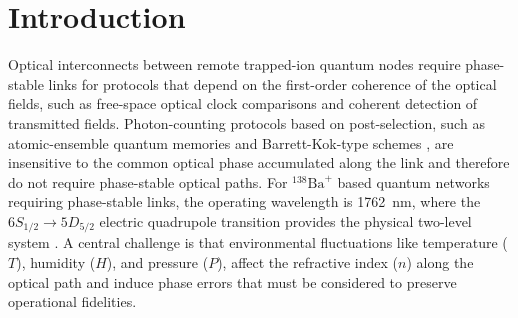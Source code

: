 \documentclass[aps,prapplied,reprint,groupedaddress,twocolumn,superscriptaddress,linenumbers]{revtex4-2}
\begin{document}
\maketitle

\section{Introduction}
\label{sec:intro}

Optical interconnects between remote trapped-ion quantum nodes require phase-stable links for protocols that depend on the first-order coherence of the optical fields, such as free-space optical clock comparisons \cite{giorgetta2013optical,shen2022free} and coherent detection of transmitted fields. Photon-counting protocols based on post-selection, such as atomic-ensemble quantum memories \cite{duan2001long} and Barrett-Kok-type schemes \cite{barrett2005efficient}, are insensitive to the common optical phase accumulated along the link and therefore do not require phase-stable optical paths. For $^{138}\mathrm{Ba}^+$ based quantum networks requiring phase-stable links, the operating wavelength is \SI{1762}{\nano\meter}, where the $6S_{1/2} \rightarrow 5D_{5/2}$ electric quadrupole transition provides the physical two-level system \cite{dietrich2009barium,arnold2020precision}. A central challenge is that environmental fluctuations like temperature ($T$), humidity ($H$), and pressure ($P$), affect the refractive index ($n$) along the optical path and induce phase errors that must be considered to preserve operational fidelities.
\end{document}
